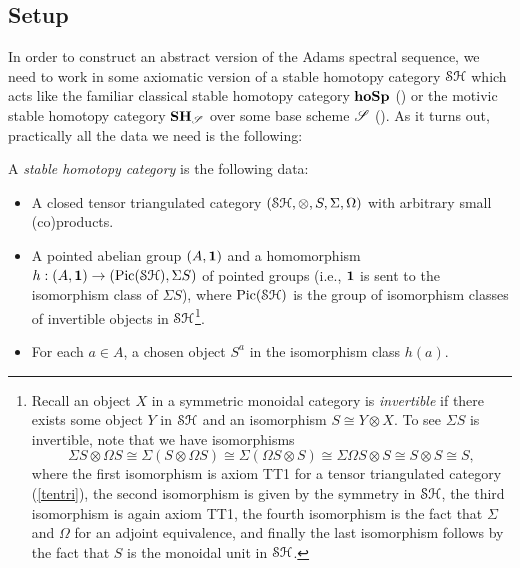 \documentclass[../main.tex]{subfiles}
\begin{document}
\subsection{Setup}\label{setup}

In order to construct an abstract version of the Adams spectral sequence, we need to work in some axiomatic version of a stable homotopy category $\mathcal{SH}$ which acts like the familiar classical stable homotopy category $\mathbf{hoSp}$ () or the motivic stable homotopy category $\mathbf{SH}_{\mathscr{S}}$ over some base scheme $\mathscr{S}$ (). As it turns out, practically all the data we need is the following:

\begin{definition}\label{stable_homotopy_cat}
	A \emph{stable homotopy category} is the following data:
	\begin{itemize}
		\item A closed tensor triangulated category $(\mathcal{SH},\otimes,S,\Sigma,\Omega)$ with arbitrary small (co)products.
		\item A pointed abelian group $(A,\mathbf{1})$ and a homomorphism $h:(A,\mathbf{1})\to(\operatorname{Pic}(\mathcal{SH}),\Sigma S)$ of pointed groups (i.e., $\mathbf{1}$ is sent to the isomorphism class of $\Sigma S$), where $\operatorname{Pic}(\mathcal{SH})$ is the group of isomorphism classes of invertible objects in $\mathcal{SH}$\footnote{Recall an object $X$ in a symmetric monoidal category is \emph{invertible} if there exists some object $Y$ in $\mathcal{SH}$ and an isomorphism $S\cong Y\otimes X$. To see $\Sigma S$ is invertible, note that we have isomorphisms
		\[\Sigma S\otimes \Omega S\cong\Sigma(S\otimes\Omega S)\cong \Sigma(\Omega S\otimes S)\cong\Sigma\Omega S\otimes S\cong S\otimes S\cong S,\]
		where the first isomorphism is axiom TT1 for a tensor triangulated category (\autoref{tentri}), the second isomorphism is given by the symmetry in $\mathcal{SH}$, the third isomorphism is again axiom TT1, the fourth isomorphism is the fact that $\Sigma$ and $\Omega$ for an adjoint equivalence, and finally the last isomorphism follows by the fact that $S$ is the monoidal unit in $\mathcal{SH}$.}.
		\item For each $a\in A$, a chosen object $S^a$ in the isomorphism class $h(a)$.
	\end{itemize}
\end{definition}
\end{document}
